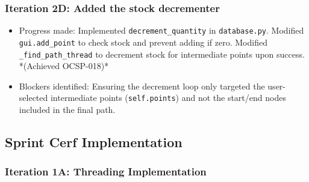 \subsubsection{Iteration 2D: Added the stock decrementer}
\begin{itemize}
	\item Progress made: Implemented \verb|decrement_quantity| in \verb|database.py|. Modified \verb|gui.add_point| to check stock and prevent adding if zero. Modified \verb|_find_path_thread| to decrement stock for intermediate points upon success. *(Achieved OCSP-018)*
	\item Blockers identified: Ensuring the decrement loop only targeted the user-selected intermediate points (\verb|self.points|) and not the start/end nodes included in the final path.
\end{itemize}

\clearpage
\subsection{Sprint Cerf Implementation}

\subsubsection{Iteration 1A: Threading Implementation}

